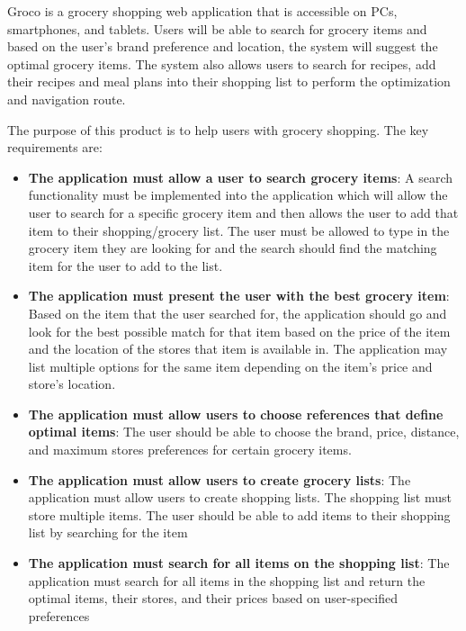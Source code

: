 Groco is a grocery shopping web application that is accessible on PCs, smartphones, and tablets. Users will be able to search for grocery items and based on the user's brand preference and location, the system will suggest the optimal grocery items. The system also allows users to search for recipes, add their recipes and meal plans into their shopping list to perform the optimization and navigation route.

The purpose of this product is to help users with grocery shopping. The key requirements are:
\begin{itemize}
\item \textbf{The application must allow a user to search grocery items}: A search functionality must be implemented into the application which will allow the user to search for a specific grocery item and then allows the user to add that item to their shopping/grocery list. The user must be allowed to type in the grocery item they are looking for and the search should find the matching item for the user to add to the list.

\item \textbf{The application must present the user with the best grocery item}: Based on the item that the user searched for, the application should go and look for the best possible match for that item based on the price of the item and the location of the stores that item is available in. The application may list multiple options for the same item depending on the item's price and store's location.

\item \textbf{The application must allow users to choose references that define optimal items}: The user should be able to choose the brand, price, distance, and maximum stores preferences for certain grocery items.

\item \textbf{The application must allow users to create grocery lists}: The application must allow users to create shopping lists. The shopping list must store multiple items. The user should be able to add items to their shopping list by searching for the item

\item \textbf{The application must search for all items on the shopping list}: The application must search for all items in the shopping list and return the optimal items, their stores, and their prices based on user-specified preferences


\end{itemize}
